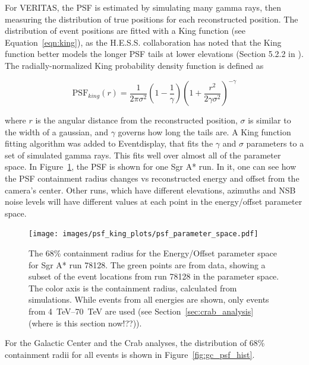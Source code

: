     For VERITAS, the PSF is estimated by simulating many gamma rays, then measuring the distribution of true positions for each reconstructed position.
    The distribution of event positions are fitted with a King function \cite{king1962} (see Equation~\ref{eqn:king}), as the H.E.S.S. collaboration has noted that the King function better models the longer PSF tails at lower elevations (Section 5.2.2 in \cite{Mayer2015}).
    The radially-normalized King probability density function is defined as

    \begin{equation} \label{eqn:king}
    \text{PSF}_{king}(r) = \frac{1}{2 \pi \sigma^{2} } \left( 1 - \frac{1}{\gamma} \right) \left( 1 + \frac{ r^{2} }{ 2 \gamma \sigma^{2} } \right)^{-\gamma}
    \end{equation}

    where $r$ is the angular distance from the reconstructed position, $\sigma$ is similar to the width of a gaussian, and $\gamma$ governs how long the tails are.
    A King function fitting algorithm was added to Eventdisplay, that fits the $\gamma$ and $\sigma$ parameters to a set of simulated gamma rays.
    This fits well over almost all of the parameter space.
    In Figure~\ref{fig:psf_paramspace}, the PSF is shown for one Sgr A* run.
    In it, one can see how the PSF containment radius changes vs reconstructed energy and offset from the camera's center.
    Other runs, which have different elevations, azimuths and NSB noise levels will have different values at each point in the energy/offset parameter space.

    \begin{figure}[ht]
      \centering
      \texttt{[image: images/psf\_king\_plots/psf\_parameter\_space.pdf]}
      \caption[PSF Parameter Space]{
        The 68\% containment radius for the Energy/Offset parameter space for Sgr A* run 78128. 
        The green points are from data, showing a subset of the event locations from run 78128 in the parameter space.
        The color axis is the containment radius, calculated from simulations.
        While events from all energies are shown, only events from \SIrange{4}{70}{\TeV} are used (see Section~\ref{sec:crab_analysis} {\color{red}(where is this section now!??)}).
      }
      \label{fig:psf_paramspace}
    \end{figure}

    For the Galactic Center and the Crab analyses, the distribution of 68\% containment radii for all events is shown in Figure~\ref{fig:gc_psf_hist}.

